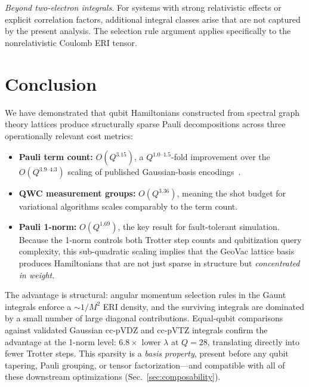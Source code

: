 \documentclass[aps,pra,twocolumn,superscriptaddress,longbibliography]{revtex4-2}
\begin{document}
\emph{Beyond two-electron integrals.}  For systems with strong
relativistic effects or explicit correlation factors, additional integral
classes arise that are not captured by the present analysis.  The selection
rule argument applies specifically to the nonrelativistic Coulomb ERI
tensor.


\section{Conclusion}
\label{sec:conclusion}

We have demonstrated that qubit Hamiltonians constructed from spectral
graph theory lattices produce structurally sparse Pauli decompositions
across three operationally relevant cost metrics:
\begin{itemize}
\item \textbf{Pauli term count:} $O(Q^{3.15})$, a $Q^{1.0\text{--}1.5}$-fold
  improvement over the $O(Q^{3.9\text{--}4.3})$ scaling of published
  Gaussian-basis encodings~\cite{trenev2025}.
\item \textbf{QWC measurement groups:} $O(Q^{3.36})$, meaning the
  shot budget for variational algorithms scales comparably to the
  term count.
\item \textbf{Pauli 1-norm:} $O(Q^{1.69})$, the key result for
  fault-tolerant simulation.  Because the 1-norm controls both
  Trotter step counts and qubitization query complexity, this
  sub-quadratic scaling implies that the GeoVac lattice basis
  produces Hamiltonians that are not just sparse in structure but
  \emph{concentrated in weight}.
\end{itemize}
The advantage is structural: angular momentum selection rules in the
Gaunt integrals enforce a $\sim 1/M^2$ ERI density, and the surviving
integrals are dominated by a small number of large diagonal
contributions.  Equal-qubit comparisons against validated Gaussian
cc-pVDZ and cc-pVTZ integrals confirm the advantage at the 1-norm
level: $6.8\times$ lower $\lambda$ at $Q = 28$, translating directly
into fewer Trotter steps.  This sparsity is a \emph{basis property},
present before any qubit tapering, Pauli grouping, or tensor
factorization---and compatible with all of these downstream
optimizations (Sec.~\ref{sec:composability}).
\end{document}
